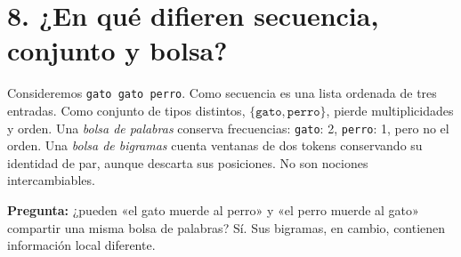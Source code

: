 \section*{8. ¿En qué difieren secuencia, conjunto y bolsa?}
Consideremos \texttt{gato gato perro}. Como secuencia es una lista ordenada de tres entradas. Como conjunto de tipos distintos, $\{\texttt{gato},\texttt{perro}\}$, pierde multiplicidades y orden. Una \emph{bolsa de palabras} conserva frecuencias: \texttt{gato}: 2, \texttt{perro}: 1, pero no el orden. Una \emph{bolsa de bigramas} cuenta ventanas de dos tokens conservando su identidad de par, aunque descarta sus posiciones. No son nociones intercambiables.
\begin{center}
\end{center}
\noindent\textbf{Pregunta:} ¿pueden «el gato muerde al perro» y «el perro muerde al gato» compartir una misma bolsa de palabras? Sí. Sus bigramas, en cambio, contienen información local diferente.

